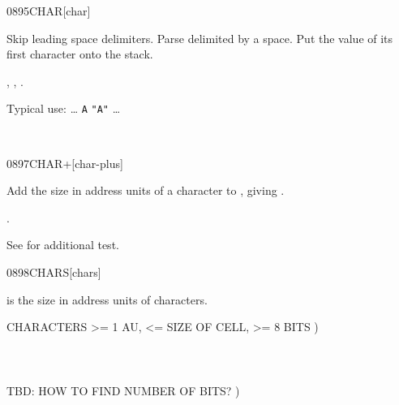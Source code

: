 \begin{worddef}{0895}{CHAR}[char]
\item {}

	Skip leading space delimiters. Parse  delimited by
	a space. Put the value of its first character onto the stack.

\see {},
	,
	.

	\begin{rationale} %
		Typical use: {\ldots}
			 \texttt{A}  \texttt{"A"} {\ldots}
	\end{rationale}

	\begin{testing} %
		 \\
	\end{testing}
\end{worddef}


\begin{worddef}{0897}{CHAR+}[char-plus]
\item {}

	Add the size in address units of a character to
	, giving .

\see {}.

	\begin{testing} %

		See  for additional test.
	\end{testing}
\end{worddef}


\begin{worddef}{0898}{CHARS}[chars]
\item {}

	 is the size in address units of 
	characters.

	\begin{testing} %
		\ttfamily
		 CHARACTERS >= 1 AU, <= SIZE OF CELL, >= 8 BITS ) \\
		 \\
		 \\
		 \\
		 TBD: HOW TO FIND NUMBER OF BITS? )
	\end{testing}
\end{worddef}

